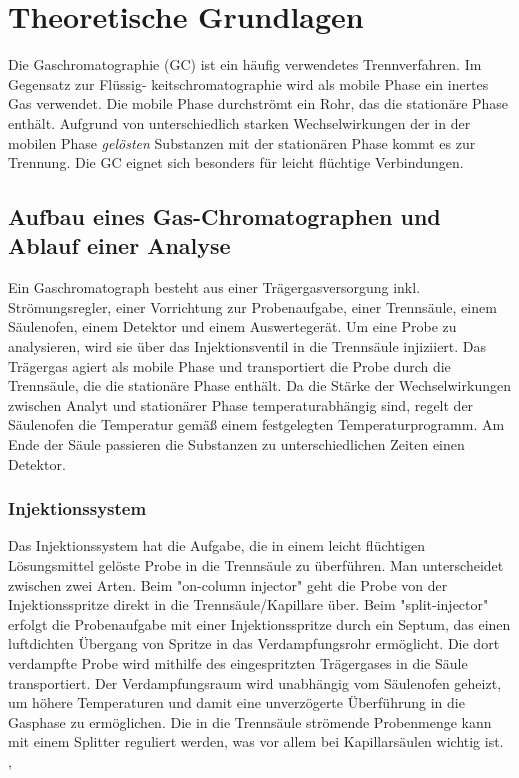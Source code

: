 \section{Theoretische Grundlagen}
  
  Die Gaschromatographie (GC) ist ein häufig verwendetes Trennverfahren. Im Gegensatz zur Flüssig- keitschromatographie wird als mobile Phase ein inertes Gas verwendet. Die mobile Phase durchströmt ein Rohr, das die stationäre Phase enthält. Aufgrund von unterschiedlich starken Wechselwirkungen der in der mobilen Phase \textit{gelösten} Substanzen mit der stationären Phase kommt es zur Trennung. Die GC eignet sich besonders für leicht flüchtige Verbindungen. \citep[S. 164, 165]{Taschenatlas}
  
  \subsection{Aufbau eines Gas-Chromatographen und Ablauf einer Analyse}
    
    Ein Gaschromatograph besteht aus einer Trägergasversorgung inkl. Strömungsregler,  einer Vorrichtung zur Probenaufgabe, einer Trennsäule, einem Säulenofen, einem Detektor und einem Auswertegerät. Um eine Probe zu analysieren, wird sie über das Injektionsventil in die Trennsäule injiziiert. Das Trägergas agiert als mobile Phase und transportiert die Probe durch die Trennsäule, die die stationäre Phase enthält. Da die Stärke der Wechselwirkungen zwischen Analyt und stationärer Phase temperaturabhängig sind, regelt der Säulenofen die Temperatur gemäß einem festgelegten Temperaturprogramm. Am Ende der Säule passieren die Substanzen zu unterschiedlichen Zeiten einen Detektor. \citep[S. 164, 165]{Taschenatlas}
    
    \subsubsection{Injektionssystem}
      
      Das Injektionssystem hat die Aufgabe, die in einem leicht flüchtigen Lösungsmittel gelöste Probe in die Trennsäule zu überführen. Man unterscheidet zwischen zwei Arten. Beim "on-column injector" geht die Probe von der Injektionsspritze direkt in die Trennsäule/Kapillare über. Beim "split-injector" erfolgt die Probenaufgabe mit einer Injektionsspritze durch ein Septum, das einen luftdichten Übergang von Spritze in das Verdampfungsrohr ermöglicht. Die dort verdampfte Probe wird mithilfe des eingespritzten Trägergases in die Säule transportiert. Der Verdampfungsraum wird unabhängig vom Säulenofen geheizt, um höhere Temperaturen und damit eine unverzögerte Überführung in die Gasphase zu ermöglichen. Die in die Trennsäule strömende Probenmenge kann mit einem Splitter reguliert werden, was vor allem bei Kapillarsäulen wichtig ist. \citep{Versuchsvorschrift}, \citep[S. 164]{Taschenatlas}          
      
